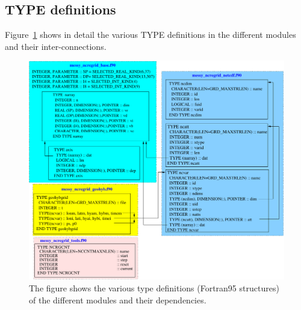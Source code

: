\documentclass[12pt, a4paper]{article}
\begin{document}
\subsection{TYPE definitions}
\label{sec:struct}
Figure~\ref{fig:types} shows in detail the various TYPE definitions
in the different modules and their inter-connections.
%
\begin{figure}
  \centerline{\includegraphics[width=14cm]{types}}
  \caption[NCREGRID type definitions]
          {The figure shows the various type definitions
           (Fortran95 structures) of the different modules
           and their dependencies.
          }
  \label{fig:types}
\end{figure}
%
\end{document}
